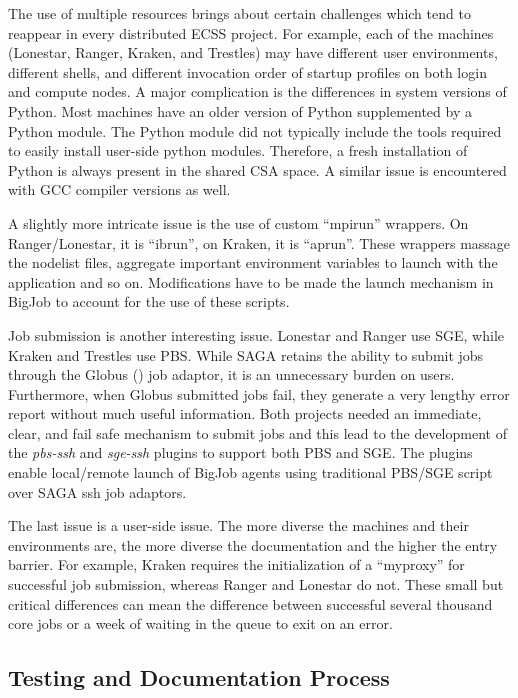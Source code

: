 \documentclass{sig-alternate}
\begin{document}
The use of multiple resources brings about certain challenges which tend to reappear in 
every distributed ECSS project. For example, each of the machines (Lonestar, Ranger, 
Kraken, and Trestles) may have different user environments, different shells, and 
different invocation order of startup profiles on both login and compute nodes. A major 
complication is the differences in system versions of Python. Most machines have an older 
version of Python supplemented by a Python module. The Python module did not typically 
include the tools required to easily install user-side python modules. Therefore, a fresh 
installation of Python is always present in the shared CSA space. A similar issue is 
encountered with GCC compiler versions as well.

A slightly more intricate issue is the use of custom ``mpirun'' wrappers. On
Ranger/Lonestar, it is ``ibrun'', on Kraken, it is ``aprun''. These wrappers
massage the nodelist files, aggregate important environment variables to launch
with the application and so on. Modifications have to be made the launch
mechanism in BigJob to account for the use of these scripts.

Job submission is another interesting issue. Lonestar and Ranger use SGE, while
Kraken and Trestles use PBS. While SAGA retains the ability to submit jobs
through the Globus (\cite{Globus}) job adaptor, it is an unnecessary burden on
users. Furthermore, when Globus submitted jobs fail, they generate a very
lengthy error report without much useful information. Both projects needed an
immediate, clear, and fail safe mechanism to submit jobs and this lead to the
development of the \textit{pbs-ssh} and \textit{sge-ssh} plugins to support both
PBS and SGE. The plugins enable local/remote launch of BigJob agents using
traditional PBS/SGE script over SAGA ssh job adaptors.

The last issue is a user-side issue. The more diverse the machines and their
environments are, the more diverse the documentation and the higher the entry
barrier. For example, Kraken requires the initialization of a ``myproxy'' for
successful job submission, whereas Ranger and Lonestar do not. These small  but
critical differences can mean the difference between successful several thousand
core jobs or a week of waiting in the queue to exit on an error.


\subsection{Testing and Documentation Process}
\end{document}
